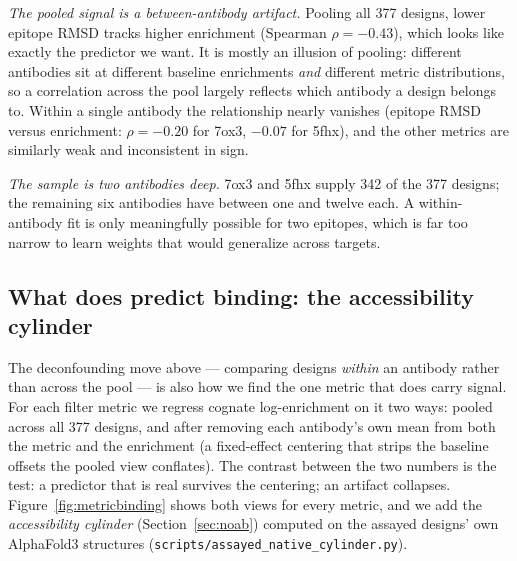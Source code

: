 \emph{The pooled signal is a between-antibody artifact.} Pooling all \num{377} designs, lower
epitope RMSD tracks higher enrichment (Spearman $\rho=-0.43$), which looks like exactly the
predictor we want. It is mostly an illusion of pooling: different antibodies sit at different
baseline enrichments \emph{and} different metric distributions, so a correlation across the pool
largely reflects which antibody a design belongs to. Within a single antibody the relationship
nearly vanishes (epitope RMSD versus enrichment: $\rho=-0.20$ for 7ox3, $-0.07$ for 5fhx), and
the other metrics are similarly weak and inconsistent in sign.

\emph{The sample is two antibodies deep.} 7ox3 and 5fhx supply \num{342} of the \num{377}
designs; the remaining six antibodies have between one and twelve each. A within-antibody fit is
only meaningfully possible for two epitopes, which is far too narrow to learn weights that would
generalize across targets.

\subsection{What does predict binding: the accessibility cylinder}\label{sec:whatpredicts}
The deconfounding move above --- comparing designs \emph{within} an antibody rather than across
the pool --- is also how we find the one metric that does carry signal. For each filter metric we
regress cognate log-enrichment on it two ways: pooled across all \num{377} designs, and after
removing each antibody's own mean from both the metric and the enrichment (a fixed-effect
centering that strips the baseline offsets the pooled view conflates). The contrast between the
two numbers is the test: a predictor that is real survives the centering; an artifact collapses.
Figure~\ref{fig:metricbinding} shows both views for every metric, and we add the
\emph{accessibility cylinder} (Section~\ref{sec:noab}) computed on the assayed designs' own
AlphaFold3 structures (\texttt{scripts/assayed\_native\_cylinder.py}).

